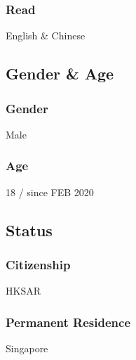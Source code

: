 \documentclass[a4paper]{article}
\begin{document}
\subsubsection{Read}
English \& Chinese
\subsection{Gender \& Age}
\subsubsection{Gender}
Male
\subsubsection{Age}
18 / since FEB 2020
\subsection{Status}
\subsubsection{Citizenship}
HKSAR
\subsubsection{Permanent Residence}
Singapore
\end{document}

